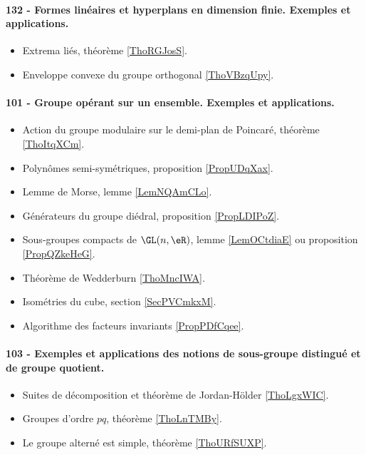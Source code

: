 \paragraph{132 - Formes linéaires et hyperplans en dimension finie. Exemples et applications.}
\begin{itemize}
    \item Extrema liés, théorème \ref{ThoRGJosS}.
    \item Enveloppe convexe du groupe orthogonal \ref{ThoVBzqUpy}.
\end{itemize}
\paragraph{101 - Groupe opérant sur un ensemble. Exemples et applications.}
\begin{itemize}
    \item Action du groupe modulaire sur le demi-plan de Poincaré, théorème \ref{ThoItqXCm}.
    \item Polynômes semi-symétriques, proposition \ref{PropUDqXax}.
    \item Lemme de Morse, lemme \ref{LemNQAmCLo}.
    \item Générateurs du groupe diédral, proposition \ref{PropLDIPoZ}.
    \item Sous-groupes compacts de \( \GL(n,\eR)\), lemme \ref{LemOCtdiaE} ou proposition \ref{PropQZkeHeG}.
    \item Théorème de Wedderburn \ref{ThoMncIWA}.
    \item Isométries du cube, section \ref{SecPVCmkxM}.
    \item Algorithme des facteurs invariants \ref{PropPDfCqee}.
\end{itemize}
\paragraph{103 - Exemples et applications des notions de sous-groupe distingué et de groupe quotient.}
\begin{itemize}
    \item Suites de décomposition et théorème de Jordan-Hölder \ref{ThoLgxWIC}.
    \item Groupes d'ordre \( pq\), théorème \ref{ThoLnTMBy}.
    \item Le groupe alterné est simple, théorème \ref{ThoURfSUXP}.
\end{itemize}
